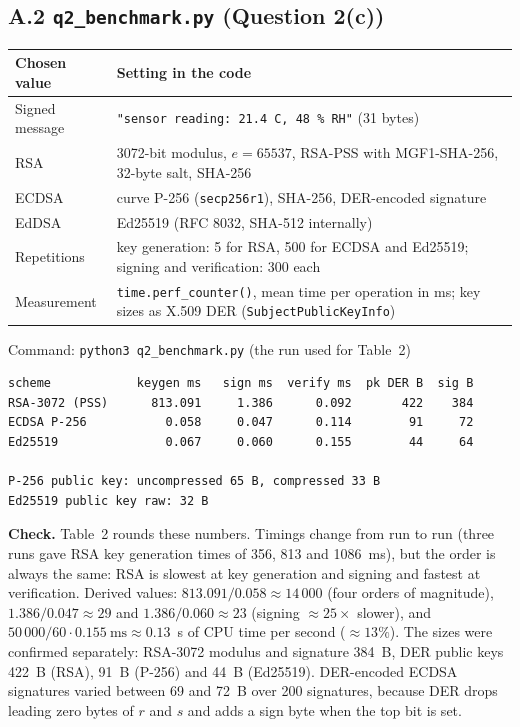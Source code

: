 \documentclass[11pt,a4paper]{article}
\begin{document}
\subsection*{A.2 \texttt{q2\_benchmark.py} (Question 2(c))}
\begin{table}[H]
\centering\small
\begin{tabularx}{\textwidth}{@{}P{4.2cm}L@{}}
\toprule
Chosen value & Setting in the code \\
\midrule
Signed message & \texttt{"sensor reading:\ 21.4 C, 48 \% RH"} (31 bytes) \\
RSA & 3072-bit modulus, $e = 65537$, RSA-PSS with MGF1-SHA-256, 32-byte salt, SHA-256 \\
ECDSA & curve P-256 (\texttt{secp256r1}), SHA-256, DER-encoded signature \\
EdDSA & Ed25519 (RFC 8032, SHA-512 internally) \\
Repetitions & key generation: 5 for RSA, 500 for ECDSA and Ed25519; signing and verification: 300 each \\
Measurement & \texttt{time.perf\_counter()}, mean time per operation in ms; key sizes as X.509 DER (\texttt{SubjectPublicKeyInfo}) \\
\bottomrule
\end{tabularx}
\end{table}
Command: \texttt{python3 q2\_benchmark.py} (the run used for Table~2)
\begin{Verbatim}[fontsize=\footnotesize, frame=single]
scheme            keygen ms   sign ms  verify ms  pk DER B  sig B
RSA-3072 (PSS)      813.091     1.386      0.092       422    384
ECDSA P-256           0.058     0.047      0.114        91     72
Ed25519               0.067     0.060      0.155        44     64

P-256 public key: uncompressed 65 B, compressed 33 B
Ed25519 public key raw: 32 B
\end{Verbatim}
\textbf{Check.} Table~2 rounds these numbers. Timings change from run to run (three runs gave RSA key generation
times of 356, 813 and 1086~ms), but the order is always the same: RSA is slowest at key generation and signing and
fastest at verification. Derived values: $813.091/0.058 \approx 14\,000$ (four orders of magnitude),
$1.386/0.047 \approx 29$ and $1.386/0.060 \approx 23$ (signing $\approx 25\times$ slower), and
$50\,000/60 \cdot 0.155~\text{ms} \approx 0.13$~s of CPU time per second ($\approx 13\%$). The sizes were confirmed
separately: RSA-3072 modulus and signature 384~B, DER public keys 422~B (RSA), 91~B (P-256) and 44~B (Ed25519).
DER-encoded ECDSA signatures varied between 69 and 72~B over 200 signatures, because DER drops leading zero bytes of
$r$ and $s$ and adds a sign byte when the top bit is set.
\end{document}
